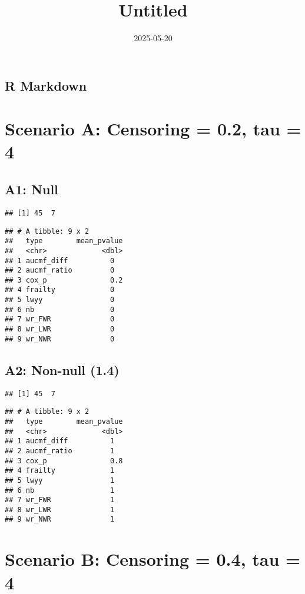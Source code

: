 \documentclass[
]{article}
\title{Untitled}
\author{}
\date{\vspace{-2.5em}2025-05-20}
\begin{document}
\maketitle

\subsection{R Markdown}\label{r-markdown}

\section{Scenario A: Censoring = 0.2, tau =
4}\label{scenario-a-censoring-0.2-tau-4}

\subsection{A1: Null}\label{a1-null}

\begin{verbatim}
## [1] 45  7
\end{verbatim}

\begin{verbatim}
## # A tibble: 9 x 2
##   type        mean_pvalue
##   <chr>             <dbl>
## 1 aucmf_diff          0  
## 2 aucmf_ratio         0  
## 3 cox_p               0.2
## 4 frailty             0  
## 5 lwyy                0  
## 6 nb                  0  
## 7 wr_FWR              0  
## 8 wr_LWR              0  
## 9 wr_NWR              0
\end{verbatim}

\subsection{A2: Non-null (1.4)}\label{a2-non-null-1.4}

\begin{verbatim}
## [1] 45  7
\end{verbatim}

\begin{verbatim}
## # A tibble: 9 x 2
##   type        mean_pvalue
##   <chr>             <dbl>
## 1 aucmf_diff          1  
## 2 aucmf_ratio         1  
## 3 cox_p               0.8
## 4 frailty             1  
## 5 lwyy                1  
## 6 nb                  1  
## 7 wr_FWR              1  
## 8 wr_LWR              1  
## 9 wr_NWR              1
\end{verbatim}

\newpage

\section{Scenario B: Censoring = 0.4, tau =
4}\label{scenario-b-censoring-0.4-tau-4}
\end{document}
